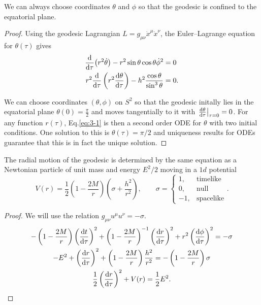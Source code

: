 \begin{claim}
  We can always choose coordinates $\theta$ and $\phi$ so that the geodesic is confined to the equatorial plane.
\end{claim}
\begin{proof}
  Using the geodesic Lagrangian $L = g_{\mu\nu} \dot{x}^{\mu} \dot{x}^{\nu}$, the Euler--Lagrange equation for $\theta(\tau)$ gives
  \begin{align}
    \dv{\tau} (r^2 \dot{\theta}) - r^2 \sin\theta \cos \theta \dot{\phi}^2 &= 0 \\
    r^2 \dv{\tau} \left( r^2 \dv{\theta}{\tau} \right) - h^2 \frac{\cos \theta}{\sin^3 \theta} &= 0.
    \label{eq:3-1}
  \end{align}

  We can choose coordinates $(\theta, \phi)$  on $S^2$  so that the geodesic initally lies in the equatorial plane $\theta(0) = \frac{\pi}{2}$ and moves tangentially to it with $\left.\dv{\theta}{\tau}\right\rvert_{\tau = 0} = 0$.
  For any function $r(\tau)$, Eq.\eqref{eq:3-1} is then a second order ODE for $\theta$ with two initial conditions.
  One solution to this is $\theta(\tau) = \pi / 2$ and uniqueness results for ODEs guarantee that this is in fact the unique solution.
\end{proof}
\begin{claim}
  The radial motion of the geodesic is determined by the same equation as a Newtonian particle of unit mass and energy $E^2 / 2$ moving in a $1d$ potential
  \begin{equation}
    V(r) = \frac{1}{2} \left( 1 - \frac{2M}{r} \right) \left( \sigma + \frac{h^2}{r^2} \right), \qquad \sigma =
    \begin{cases}
      1, & \text{timelike} \\
      0, & \text{null}  \\
      -1, & \text{spacelike}
    \end{cases}.
  \end{equation}
\end{claim}
\begin{proof}
  We will use the relation $g_{\mu\nu} u^{\mu} u^{\nu} = -\sigma$.
   \begin{gather}
     - \left( 1- \frac{2M}{r} \right) \left(\dv{t}{\tau}\right)^2 + \left( 1 - \frac{2M}{r} \right)^{-1} \left( \dv{r}{\tau} \right)^2 + r^2 \left( \dv{\phi}{\tau} \right)^2 = -\sigma \\
     -E^2 + \left( \dv{r}{\tau} \right)^2 + \left( 1 - \frac{2M}{r} \right) \frac{h^2}{r^2} = - \left( 1 - \frac{2M}{r} \right) \sigma \\
     \frac{1}{2} \left( \dv{r}{\tau} \right)^2 + V(r) = \frac{1}{2}E^2.
  \end{gather}
\end{proof}

